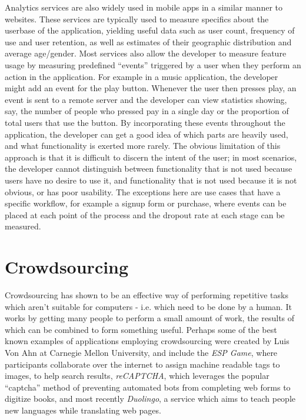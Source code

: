 Analytics services are also widely used in mobile apps in a similar manner to websites. These services are typically used to measure specifics about the userbase of the application, yielding useful data such as user count, frequency of use and user retention, as well as estimates of their geographic distribution and average age/gender. Most services also allow the developer to measure feature usage by measuring predefined ``events'' triggered by a user when they perform an action in the application. For example in a music application, the developer might add an event for the play button. Whenever the user then presses play, an event is sent to a remote server and the developer can view statistics showing, say, the number of people who pressed pay in a single day or the proportion of total users that use the button. By incorporating these events throughout the application, the developer can get a good idea of which parts are heavily used, and what functionality is exerted more rarely. The obvious limitation of this approach is that it is difficult to discern the intent of the user; in most scenarios, the developer cannot distinguish between functionality that is not used because users have no desire to use it, and functionality that is not used because it is not obvious, or has poor usability. The exceptions here are use cases that have a specific workflow, for example a signup form or purchase, where events can be placed at each point of the process and the dropout rate at each stage can be measured.

\section{Crowdsourcing}

Crowdsourcing has shown to be an effective way of performing repetitive tasks which aren't suitable for computers - i.e. which need to be done by a human. It works by getting many people to perform a small amount of work, the results of which can be combined to form something useful. Perhaps some of the best known examples of applications employing crowdsourcing were created by Luis Von Ahn at Carnegie Mellon University, and include the \emph{ESP Game}, where participants collaborate over the internet to assign machine readable tags to images, to help search results, \emph{reCAPTCHA}, which leverages the popular ``captcha'' method of preventing automated bots from completing web forms to digitize books, and most recently \emph{Duolingo}, a service which aims to teach people new languages while translating web pages.

